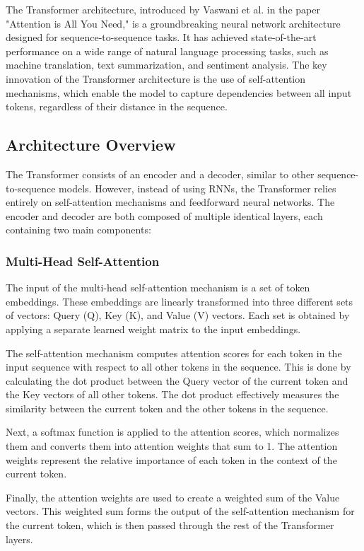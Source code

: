 \documentclass[12pt]{article}
\begin{document}
The Transformer architecture, introduced by Vaswani et al. in the paper "Attention is All You Need," is a groundbreaking neural network architecture designed for sequence-to-sequence tasks. It has achieved state-of-the-art performance on a wide range of natural language processing tasks, such as machine translation, text summarization, and sentiment analysis. The key innovation of the Transformer architecture is the use of self-attention mechanisms, which enable the model to capture dependencies between all input tokens, regardless of their distance in the sequence.

\subsection{Architecture Overview}

The Transformer consists of an encoder and a decoder, similar to other sequence-to-sequence models. However, instead of using RNNs, the Transformer relies entirely on self-attention mechanisms and feedforward neural networks. The encoder and decoder are both composed of multiple identical layers, each containing two main components:


\subsubsection{Multi-Head Self-Attention}

The input of the multi-head self-attention mechanism is a set of token embeddings. These embeddings are linearly transformed into three different sets of vectors: Query (Q), Key (K), and Value (V) vectors. Each set is obtained by applying a separate learned weight matrix to the input embeddings.

The self-attention mechanism computes attention scores for each token in the input sequence with respect to all other tokens in the sequence. This is done by calculating the dot product between the Query vector of the current token and the Key vectors of all other tokens. The dot product effectively measures the similarity between the current token and the other tokens in the sequence.

Next, a softmax function is applied to the attention scores, which normalizes them and converts them into attention weights that sum to 1. The attention weights represent the relative importance of each token in the context of the current token.

Finally, the attention weights are used to create a weighted sum of the Value vectors. This weighted sum forms the output of the self-attention mechanism for the current token, which is then passed through the rest of the Transformer layers.
\end{document}
